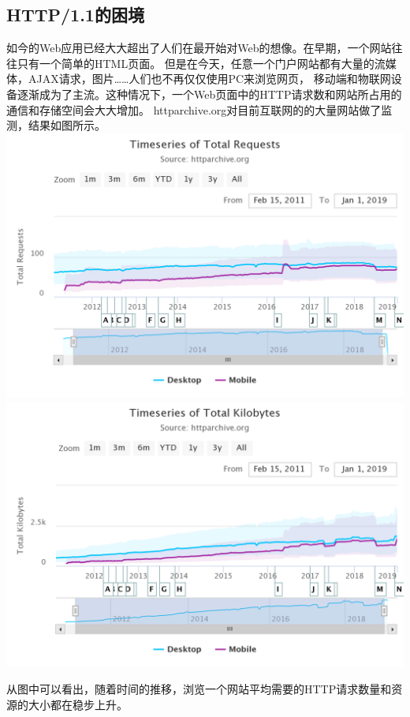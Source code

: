 \documentclass[twoside]{CUGThesis}
\begin{document}
	\subsection{HTTP/1.1的困境}
	如今的Web应用已经大大超出了人们在最开始对Web的想像。在早期，一个网站往往只有一个简单的HTML页面。
	但是在今天，任意一个门户网站都有大量的流媒体，AJAX请求，图片……人们也不再仅仅使用PC来浏览网页，
	移动端和物联网设备逐渐成为了主流。这种情况下，一个Web页面中的HTTP请求数和网站所占用的通信和存储空间会大大增加。
	httparchive.org对目前互联网的的大量网站做了监测，结果如图所示\cite{httparchive}。\\ 
	\includegraphics[scale=0.31]{Figures/web_total_reqs.png}\\
	\includegraphics[scale=0.31]{Figures/web_total_size.png}\\
	\par 
	从图中可以看出，随着时间的推移，浏览一个网站平均需要的HTTP请求数量和资源的大小都在稳步上升。
\end{document}
